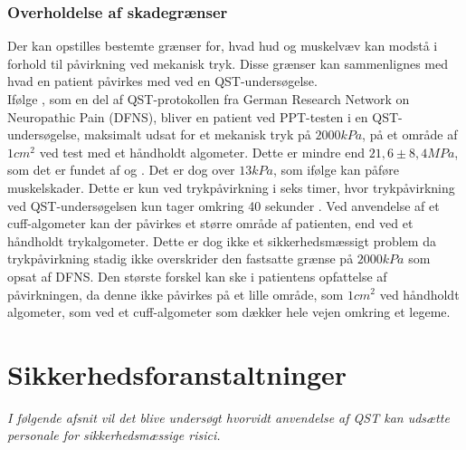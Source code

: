 \subsubsection{Overholdelse af skadegrænser}
Der kan opstilles bestemte grænser for, hvad hud og muskelvæv kan modstå i forhold til påvirkning ved mekanisk tryk. Disse grænser kan sammenlignes med hvad en patient påvirkes med ved en QST-undersøgelse. \\
Ifølge , som en del af QST-protokollen fra German Research Network on Neuropathic Pain (DFNS), bliver en patient ved PPT-testen i en QST-undersøgelse, maksimalt udsat for et mekanisk tryk på $2000 kPa$, på et område af $1 cm^{2}$ ved test med et håndholdt algometer. Dette er mindre end $21,6 \pm 8,4 MPa$, som det er fundet af  og . Det er dog over $13 kPa$, som ifølge  kan påføre muskelskader. Dette er kun ved trykpåvirkning i seks timer, hvor trykpåvirkning ved QST-undersøgelsen kun tager omkring 40 sekunder \cite{Rolke2006b}. Ved anvendelse af et cuff-algometer kan der påvirkes et større område af patienten, end ved et håndholdt trykalgometer. Dette er dog ikke et sikkerhedsmæssigt problem da trykpåvirkning stadig ikke overskrider den fastsatte grænse på $2000 kPa$ som opsat af DFNS. Den største forskel kan ske i patientens opfattelse af påvirkningen, da denne ikke påvirkes på et lille område, som $1 cm^{2}$ ved håndholdt algometer, som ved et cuff-algometer som dækker hele vejen omkring et legeme. %



\section{Sikkerhedsforanstaltninger}
\textit{I følgende afsnit vil det blive undersøgt hvorvidt anvendelse af QST kan udsætte personale for sikkerhedsmæssige risici.}

